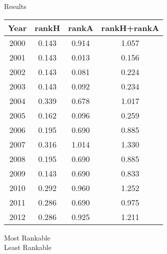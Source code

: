 \documentclass{beamer}
\begin{document}
\begin{frame}{Results}
\begin{minipage}{0.6\textwidth}
\centering
\begin{tabular}{|| c | c | c | c ||}
\hline
Year & rankH & rankA & rankH+rankA \\
\hline\hline
2000 & 0.143 & 0.914 & 1.057 \\
\hline
\rowcolor{secondary}
2001 & 0.143 & 0.013 & 0.156 \\
\hline
2002 & 0.143 & 0.081 & 0.224 \\
\hline
2003 & 0.143 & 0.092 & 0.234 \\
\hline
2004 & 0.339 & 0.678 & 1.017 \\
\hline
2005 & 0.162 & 0.096 & 0.259 \\
\hline
2006 & 0.195 & 0.690 & 0.885 \\
\hline
\rowcolor{text}
2007 & 0.316 & 1.014 & 1.330\\
\hline
2008 & 0.195 & 0.690 & 0.885 \\
\hline
2009 & 0.143 & 0.690 & 0.833 \\
\hline
2010 & 0.292 & 0.960 & 1.252 \\
\hline
2011 & 0.286 & 0.690 & 0.975 \\
\hline
2012 & 0.286 & 0.925 & 1.211 \\
\hline
\end{tabular}
\end{minipage}\hfill
\begin{minipage}{0.3\textwidth}
\vfill
{}\quad Most Rankable\\
\vfill
{}\quad Least Rankable\\
\vfill
\end{minipage}
\end{frame}
\end{document}
